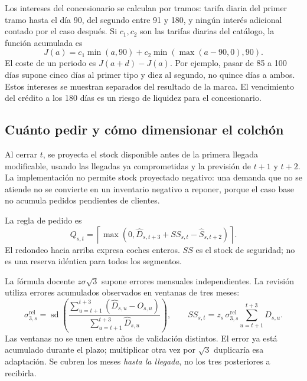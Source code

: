 Los intereses del concesionario se calculan por tramos: tarifa diaria del primer
tramo hasta el día 90, del segundo entre 91 y 180, y ningún interés adicional
contado por el caso después. Si $c_1,c_2$ son las tarifas diarias del catálogo,
la función acumulada es
\begin{equation}
 J(a)=c_1\min(a,90)+c_2\min\!\left(\max(a-90,0),90\right).
\end{equation}
El coste de un periodo es $J(a+d)-J(a)$. Por ejemplo, pasar de 85 a 100 días
supone cinco días al primer tipo y diez al segundo, no quince días a ambos.
Estos intereses se muestran separados del resultado de la marca. El vencimiento
del crédito a los 180 días es un riesgo de liquidez para el concesionario.

\subsection{Cuánto pedir y cómo dimensionar el colchón}
Al cerrar $t$, se proyecta el stock disponible antes de la primera llegada
modificable, usando las llegadas ya comprometidas y la previsión de $t+1$ y
$t+2$. La implementación no permite stock proyectado negativo: una demanda que
no se atiende no se convierte en un inventario negativo a reponer, porque el
caso base no acumula pedidos pendientes de clientes.

La regla de pedido es
\begin{equation}\label{eq:pedido}
 Q_{s,t}=\left\lceil\max\!\left(0,
 \widehat D_{s,t+3}+SS_{s,t}-\widehat S_{s,t+2}\right)\right\rceil.
\end{equation}
El redondeo hacia arriba expresa coches enteros. $SS$ es el stock de seguridad;
no es una reserva idéntica para todos los segmentos.

La fórmula docente $z\sigma\sqrt{3}$ supone errores mensuales independientes.
La revisión utiliza errores acumulados observados en ventanas de tres meses:
\begin{equation}
 \sigma_{3,s}^{\mathrm{rel}}
 =\operatorname{sd}\left(
 \frac{\sum_{u=t+1}^{t+3}(\widehat D_{s,u}-O_{s,u})}
      {\sum_{u=t+1}^{t+3}\widehat D_{s,u}}\right),\qquad
 SS_{s,t}=z_s\,\sigma_{3,s}^{\mathrm{rel}}
                \sum_{u=t+1}^{t+3}\widehat D_{s,u}.
\end{equation}
Las ventanas no se unen entre años de validación distintos. El error ya está
acumulado durante el plazo; multiplicar otra vez por $\sqrt3$ duplicaría esa
adaptación. Se cubren los meses \emph{hasta la llegada}, no los tres posteriores
a recibirla.

